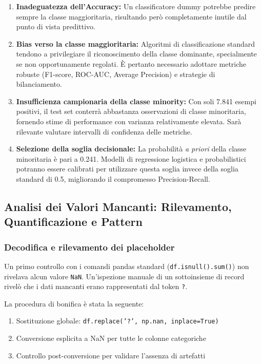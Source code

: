 \begin{enumerate}
    \item \textbf{Inadeguatezza dell'Accuracy:} Un classificatore dummy potrebbe predire sempre la classe maggioritaria, risultando però completamente inutile dal punto di vista predittivo.
    
    \item \textbf{Bias verso la classe maggioritaria:} Algoritmi di classificazione standard tendono a privilegiare il riconoscimento della classe dominante, specialmente se non opportunamente regolati. È pertanto necessario adottare metriche robuste (F1-score, ROC-AUC, Average Precision) e strategie di bilanciamento.
    
    \item \textbf{Insufficienza campionaria della classe minority:} Con soli 7.841 esempi positivi, il test set conterrà abbastanza osservazioni di classe minoritaria, fornendo stime di performance con varianza relativamente elevata. Sarà rilevante valutare intervalli di confidenza delle metriche.
    
    \item \textbf{Selezione della soglia decisionale:} La probabilità \textit{a priori} della classe minoritaria è pari a 0.241. Modelli di regressione logistica e probabilistici potranno essere calibrati per utilizzare questa soglia invece della soglia standard di 0.5, migliorando il compromesso Precision-Recall.
\end{enumerate}

\subsection{Analisi dei Valori Mancanti: Rilevamento, Quantificazione e Pattern}

\subsubsection{Decodifica e rilevamento dei placeholder}

Un primo controllo con i comandi pandas standard (\texttt{df.isnull().sum()}) non rivelava alcun valore \texttt{NaN}. Un'ispezione manuale di un sottoinsieme di record rivelò che i dati mancanti erano rappresentati dal token \texttt{?}.

La procedura di bonifica è stata la seguente:
\begin{enumerate}
    \item Sostituzione globale: \texttt{df.replace('?', np.nan, inplace=True)}
    \item Conversione esplicita a NaN per tutte le colonne categoriche
    \item Controllo post-conversione per validare l'assenza di artefatti
\end{enumerate}

